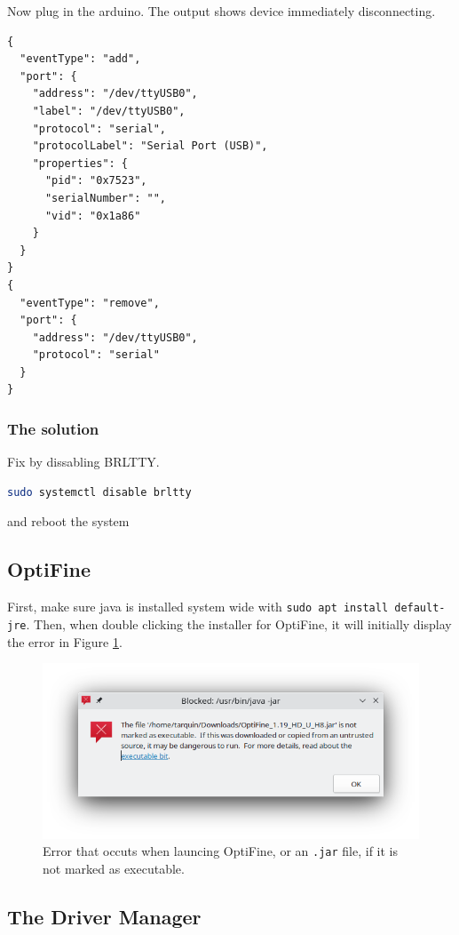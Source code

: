\documentclass[a4paper, 12pt]{article}
\begin{document}
Now plug in the arduino.
The output shows device immediately disconnecting.

\begin{lstlisting}
{
  "eventType": "add",
  "port": {
    "address": "/dev/ttyUSB0",
    "label": "/dev/ttyUSB0",
    "protocol": "serial",
    "protocolLabel": "Serial Port (USB)",
    "properties": {
      "pid": "0x7523",
      "serialNumber": "",
      "vid": "0x1a86"
    }
  }
}
{
  "eventType": "remove",
  "port": {
    "address": "/dev/ttyUSB0",
    "protocol": "serial"
  }
}
\end{lstlisting}

\subsubsection{The solution}

Fix by dissabling BRLTTY.

\begin{lstlisting}[language=Bash]
sudo systemctl disable brltty
\end{lstlisting}

and reboot the system

\subsection{OptiFine}

First, make sure java is installed system wide with \texttt{sudo apt install default-jre}. Then, when
double clicking the installer for OptiFine, it will initially display the error in Figure \ref{fig:optifine}.

\begin{figure}[h]
 \centering
 \includegraphics[width=0.6\linewidth]{images/optifine}
 \caption{Error that occuts when launcing OptiFine, or an \texttt{.jar} file, if it is not marked as executable.}
 \label{fig:optifine}
\end{figure}

\subsection{The Driver Manager}
\end{document}
